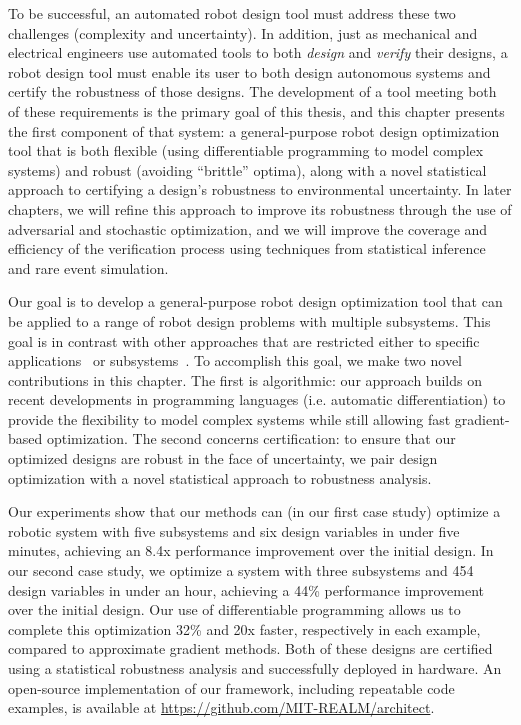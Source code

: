 To be successful, an automated robot design tool must address these two challenges (complexity and uncertainty). In addition, just as mechanical and electrical engineers use automated tools to both \textit{design} and \textit{verify} their designs, a robot design tool must enable its user to both design autonomous systems and certify the robustness of those designs. The development of a tool meeting both of these requirements is the primary goal of this thesis, and this chapter presents the first component of that system: a general-purpose robot design optimization tool that is both flexible (using differentiable programming to model complex systems) and robust (avoiding ``brittle'' optima), along with a novel statistical approach to certifying a design's robustness to environmental uncertainty. In later chapters, we will refine this approach to improve its robustness through the use of adversarial and stochastic optimization, and we will improve the coverage and efficiency of the verification process using techniques from statistical inference and rare event simulation.

Our goal is to develop a general-purpose robot design optimization tool that can be applied to a range of robot design problems with multiple subsystems. This goal is in contrast with other approaches that are restricted either to specific applications~\cite{Schulz_robogami,du2016computational,soft_robot_optimization_review,du2021underwater,ma2021diffaqua,zhang_mdo_analysis} or subsystems~\cite{xu_uav_controllers}. To accomplish this goal, we make two novel contributions in this chapter. The first is algorithmic: our approach builds on recent developments in programming languages (i.e. automatic differentiation) to provide the flexibility to model complex systems while still allowing fast gradient-based optimization. The second concerns certification: to ensure that our optimized designs are robust in the face of uncertainty, we pair design optimization with a novel statistical approach to robustness analysis.

Our experiments show that our methods can (in our first case study) optimize a robotic system with five subsystems and six design variables in under five minutes, achieving an 8.4x performance improvement over the initial design. In our second case study, we optimize a system with three subsystems and 454 design variables in under an hour, achieving a 44\% performance improvement over the initial design. Our use of differentiable programming allows us to complete this optimization 32\% and 20x faster, respectively in each example, compared to approximate gradient methods. Both of these designs are certified using a statistical robustness analysis and successfully deployed in hardware. An open-source implementation of our framework, including repeatable code examples, is available at \url{https://github.com/MIT-REALM/architect}.


